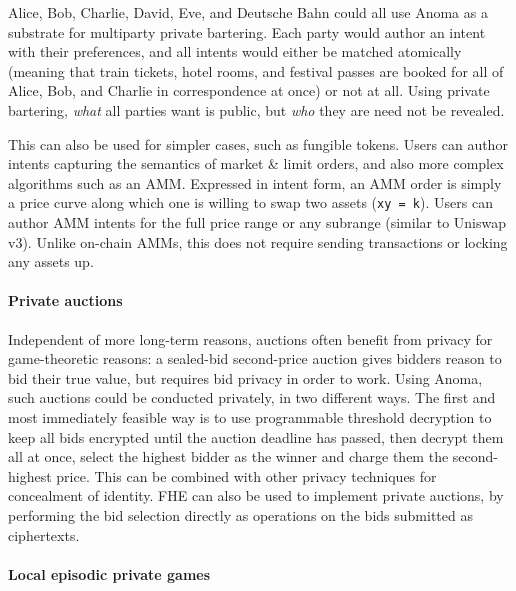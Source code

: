 Alice, Bob, Charlie, David, Eve, and Deutsche Bahn could all use Anoma
as a substrate for multiparty private bartering. Each party would author
an intent with their preferences, and all intents would either be
matched atomically (meaning that train tickets, hotel rooms, and
festival passes are booked for all of Alice, Bob, and Charlie in
correspondence at once) or not at all. Using private bartering,
\emph{what} all parties want is public, but \emph{who} they are need not
be revealed.

This can also be used for simpler cases, such as fungible tokens. Users
can author intents capturing the semantics of market \& limit orders,
and also more complex algorithms such as an AMM. Expressed in intent
form, an AMM order is simply a price curve along which one is willing to
swap two assets (\texttt{xy\ =\ k}). Users can author AMM intents for
the full price range or any subrange (similar to Uniswap v3). Unlike
on-chain AMMs, this does not require sending transactions or locking any
assets up.

\paragraph{Private auctions}\label{private-auctions}

Independent of more long-term reasons, auctions often benefit from
privacy for game-theoretic reasons: a sealed-bid second-price auction
gives bidders reason to bid their true value, but requires bid privacy
in order to work. Using Anoma, such auctions could be conducted
privately, in two different ways. The first and most immediately
feasible way is to use programmable threshold decryption to keep all
bids encrypted until the auction deadline has passed, then decrypt them
all at once, select the highest bidder as the winner and charge them the
second-highest price. This can be combined with other privacy techniques
for concealment of identity. FHE can also be used to implement private
auctions, by performing the bid selection directly as operations on the
bids submitted as ciphertexts.

\paragraph{Local episodic private
games}\label{local-episodic-private-games}

